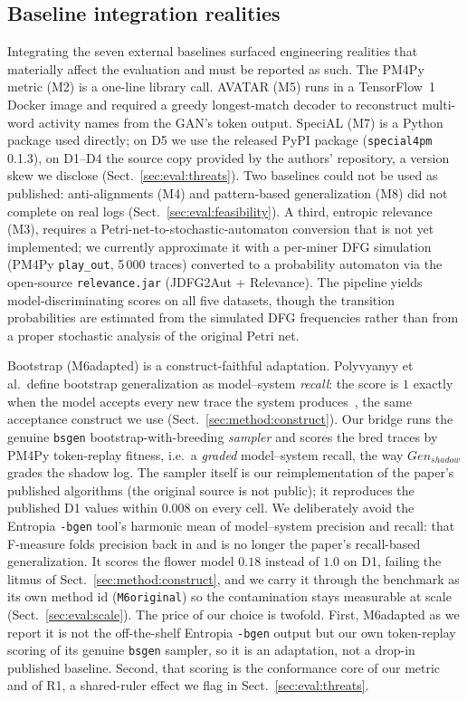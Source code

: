 \documentclass[runningheads]{llncs}
\newcommand{\chg}[1]{\textcolor{chgblue}{#1}}
\newcommand{\genshadow}{\ensuremath{\mathit{Gen}_{\mathit{shadow}}}}
\begin{document}
\subsection{Baseline integration realities}
\label{sec:impl:baselines}
Integrating the seven external baselines surfaced engineering realities that materially affect the evaluation and must be reported as such. The PM4Py metric (M2) is a one-line library call. AVATAR (M5) runs in a TensorFlow~1 Docker image and required a greedy longest-match decoder to reconstruct multi-word activity names from the GAN's token output. SpeciAL (M7) is a Python package used directly\chg{; on D5 we use the released PyPI package (\texttt{special4pm} 0.1.3), on D1--D4 the source copy provided by the authors' repository, a version skew we disclose (Sect.~\ref{sec:eval:threats})}. Two baselines could not be used as published: anti-alignments (M4) and pattern-based generalization (M8) did not complete on real logs (Sect.~\ref{sec:eval:feasibility}). A third, entropic relevance (M3), requires a Petri-net-to-stochastic-automaton conversion that is not yet implemented; we currently approximate it with a per-miner DFG simulation (PM4Py \texttt{play\_out}, 5\,000 traces) converted to a probability automaton via the open-source \texttt{relevance.jar} (JDFG2Aut + Relevance). The pipeline yields model-discriminating scores on all \chg{five} datasets, though the transition probabilities are estimated from the simulated DFG frequencies rather than from a proper stochastic analysis of the original Petri net.

Bootstrap (M6adapted) is a construct-faithful adaptation. Polyvyanyy et al.\ define bootstrap generalization as model--system \emph{recall}: the score is $1$ exactly when the model accepts every new trace the system produces~\cite{polyvyanyy2022bootstrap}, the same acceptance construct we use (Sect.~\ref{sec:method:construct}). Our bridge runs the genuine \texttt{bsgen} bootstrap-with-breeding \emph{sampler} and scores the bred traces by PM4Py token-replay fitness, i.e.\ a \emph{graded} model--system recall, the way \genshadow{} grades the shadow log. \chg{The sampler itself is our reimplementation of the paper's published algorithms (the original source is not public); it reproduces the published D1 values within $0.008$ on every cell.} We deliberately avoid the Entropia \texttt{-bgen} tool's harmonic mean of model--system precision and recall: that F-measure folds precision back in and is no longer the paper's recall-based generalization. It scores the flower model $0.18$ instead of $1.0$ on D1, failing the litmus of Sect.~\ref{sec:method:construct}\chg{, and we carry it through the benchmark as its own method id (\texttt{M6original}) so the contamination stays measurable at scale (Sect.~\ref{sec:eval:scale})}. The price of our choice is twofold. First, M6adapted as we report it is not the off-the-shelf Entropia \texttt{-bgen} output but our own token-replay scoring of its genuine \texttt{bsgen} sampler, so it is an adaptation, not a drop-in published baseline. Second, that scoring is the conformance core of our metric and of R1, a shared-ruler effect we flag in Sect.~\ref{sec:eval:threats}.
\end{document}
